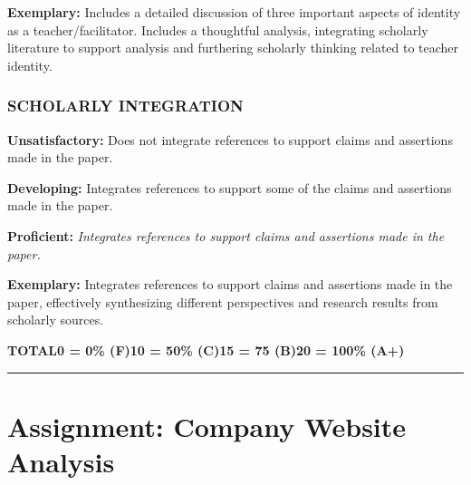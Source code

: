 \documentclass[
]{book}
\begin{document}
\textbf{Exemplary:} Includes a detailed discussion of three important aspects of identity as a teacher/facilitator. Includes a thoughtful analysis, integrating scholarly literature to support analysis and furthering scholarly thinking related to teacher identity.

\hypertarget{scholarly-integration}{%
\subsubsection*{SCHOLARLY INTEGRATION}\label{scholarly-integration}}

\textbf{Unsatisfactory:} Does not integrate references to support claims and assertions made in the paper.

\textbf{Developing:} Integrates references to support some of the claims and assertions made in the paper.

\textbf{Proficient:} \emph{Integrates references to support claims and assertions made in the paper.}

\textbf{Exemplary:} Integrates references to support claims and assertions made in the paper, effectively synthesizing different perspectives and research results from scholarly sources.

\textbar{}\textbf{TOTAL}\textbar{}\textbf{0 = 0\% (F)}\textbar{}\textbf{10 = 50\% (C)}\textbar{}\textbf{15 = 75 (B)}\textbar{}\textbf{20 = 100\% (A+)}\textbar{}

\begin{center}\rule{0.5\linewidth}{0.5pt}\end{center}

\hypertarget{assignment-company-website-analysis}{%
\section*{Assignment: Company Website Analysis}\label{assignment-company-website-analysis}}
\end{document}
